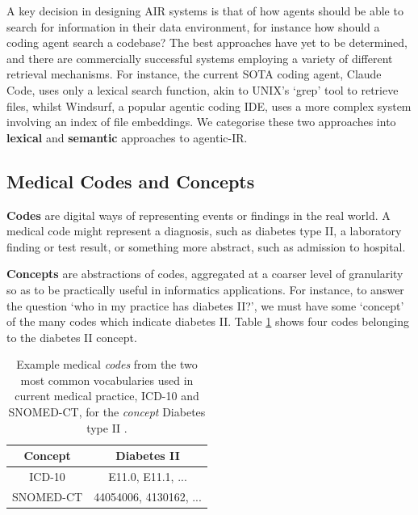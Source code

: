 \documentclass[11pt]{article}
\begin{document}
A key decision in designing AIR systems is that of how agents should be able to search for information in their data environment, for instance how should a coding agent search a codebase? The best approaches have yet to be determined, and there are commercially successful systems employing a variety of different retrieval mechanisms.
For instance, the current SOTA coding agent, Claude Code, uses only a lexical search function, akin to UNIX's `grep' tool to retrieve files, whilst Windsurf, a popular agentic coding IDE, uses a more complex system involving an index of file embeddings. We categorise these two approaches into \textbf{lexical} and \textbf{semantic} approaches to agentic-IR.

\subsection{Medical Codes and Concepts}

\textbf{Codes} are digital ways of representing events or findings in the real world. A medical code might represent a diagnosis, such as diabetes type II, a laboratory finding or test result, or something more abstract, such as admission to hospital.

\textbf{Concepts} are abstractions of codes, aggregated at a coarser level of granularity so as to be practically useful in informatics applications.
For instance, to answer the question `who in my practice has diabetes II?', we must have some `concept' of the many codes which indicate diabetes II. Table \ref{tab:concept-as-multi-vocab-codelist} shows four codes belonging to the diabetes II concept.


\begin{table}[h]
    \centering
    \begin{tabular}{c|c}
         Concept & Diabetes II \\
         \hline
         ICD-10 & E11.0, E11.1, ... \\
         SNOMED-CT & 44054006, 4130162, ...\\
    \end{tabular}
    \caption{Example medical \textit{codes} from the two most common vocabularies used in current medical practice, ICD-10 and SNOMED-CT, for the \textit{concept} Diabetes type II \cite{world_health_organization_icd-10_2004, bhattacharyya_introduction_2015}.}
    \label{tab:concept-as-multi-vocab-codelist}
\end{table}
\end{document}
